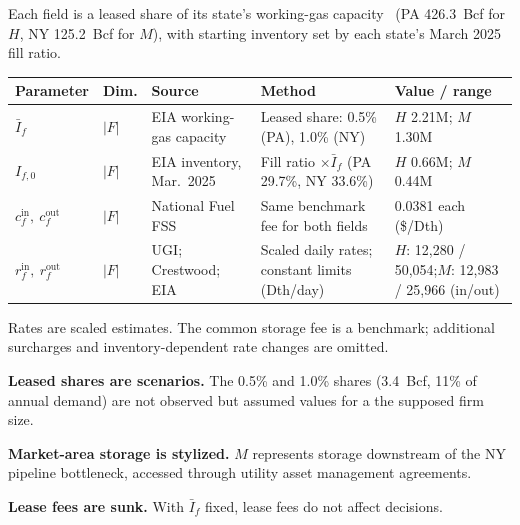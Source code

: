 \documentclass[11pt]{article}
\makeatletter
\newcommand{\subhead}[1]{\vspace{0.4em}\noindent{\bfseries\color{navy}#1}\par\vspace{0.1em}}
\newenvironment{ptable}
  {\par\smallskip\noindent\small
   \begin{tabular}{@{}p{1.9cm} p{1.2cm} p{3.6cm} p{4.5cm} p{3.7cm}@{}}
   \hline
   \textbf{Parameter} & \textbf{Dim.} & \textbf{Source} & \textbf{Method} & \textbf{Value / range} \\
   \hline}
  {\hline\end{tabular}\par\smallskip}
\makeatother
\begin{document}
\subhead{Storage}
Each field is a leased share of its state's working-gas capacity~\cite{eia} (PA 426.3~Bcf for $H$, NY
125.2~Bcf for $M$), with starting inventory set by each state's March 2025 fill ratio.
\begin{ptable}
$\bar{I}_f$ & $|F|$ & EIA working-gas capacity~\cite{eia} & Leased share: 0.5\% (PA), 1.0\% (NY) & $H$ 2.21M; $M$ 1.30M \\
$I_{f,0}$ & $|F|$ & EIA inventory, Mar.\ 2025~\cite{eia} & Fill ratio $\times \bar{I}_f$ (PA 29.7\%, NY 33.6\%) & $H$ 0.66M; $M$ 0.44M \\
$c^{\mathrm{in}}_f,\ c^{\mathrm{out}}_f$ & $|F|$ & National Fuel FSS~\cite{nfgstorage} & Same benchmark fee for both fields & 0.0381 each (\$/Dth) \\
$r^{\mathrm{in}}_f,\ r^{\mathrm{out}}_f$ & $|F|$ & UGI; Crestwood; EIA~\cite{ugi,crestwood,eia} & Scaled daily rates; constant limits (Dth/day) & $H$: 12,280 / 50,054;\newline $M$: 12,983 / 25,966 (in/out) \\
\end{ptable}
Rates are scaled estimates. The common storage fee is a benchmark; additional surcharges and
inventory-dependent rate changes are omitted.
\vspace{-0.3\baselineskip}
\begin{assume}[resume=assumptions]
  \item \textbf{Leased shares are scenarios.} The 0.5\% and 1.0\% shares (3.4~Bcf, 11\% of annual
        demand) are not observed but assumed values for a the supposed firm size.
  \item \textbf{Market-area storage is stylized.} $M$ represents storage downstream of the NY
        pipeline bottleneck, accessed through utility asset management agreements.
  \item \textbf{Lease fees are sunk.} With $\bar{I}_f$ fixed, lease fees do not affect decisions.
\end{assume}
\end{document}
